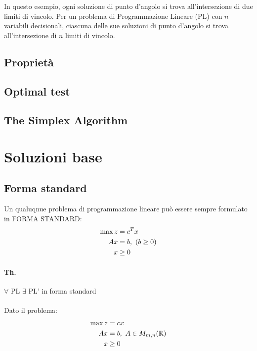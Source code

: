 \documentclass[a4paper, 11pt]{article}
\begin{document}
        In questo esempio, ogni soluzione di punto d'angolo si trova all'intersezione di due limiti di vincolo. Per un problema di Programmazione Lineare (PL) con $n$ variabili decisionali, ciascuna delle sue soluzioni di punto d'angolo si trova all'intersezione di $n$ limiti di vincolo.
        


        \subsection{Proprietà}
        \subsection{Optimal test}
        \subsection{The Simplex Algorithm}

    
    
    



    \section{Soluzioni base}
        \subsection{Forma standard}
            Un qualuqnue problema di programmazione lineare può essere sempre formulato in FORMA STANDARD:
            \begin{align}
               \max{z} &= c^{T}x \notag \\
                Ax &= b, \text{ ($b \geq 0$)} \notag \\
                x & \geq 0 \notag 
            \end{align}

            \paragraph{Th. } $\forall$ PL $\exists$ PL' in forma standard

            \paragraph{}
            Dato il problema: 
            \begin{align}
                \max{z} &= cx \notag \\
                 Ax &= b, \text{ } A \in M_{m,n}(\mathbb{R}) \notag \\
                 x & \geq 0 \notag 
            \end{align}
            
\end{document}
